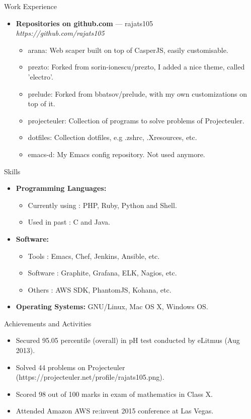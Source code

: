 \documentclass[a4paper,11pt,oneside]{article}
\newenvironment{ressection}[1]{
  \vspace{4pt}
         {\fontfamily{phv}\selectfont\Large#1}
         \begin{itemize}
           \vspace{3pt}
}{
         \end{itemize}
}
\newcommand{\resitem}[1]{
  \vspace{-4pt}
\item \begin{flushleft} #1 \end{flushleft}
}
\newcommand{\ressubitem}[1]{
  \vspace{-1pt}
\item \begin{flushleft} #1 \end{flushleft}
}
\newcommand{\resbigitem}[3]{
  \vspace{-5pt}
\item
  \textbf{#1} --- #2 \\
  \textit{#3}
}
\newenvironment{ressubsec}[3]{
  \resbigitem{#1}{#2}{#3}
  \vspace{-2pt}
  \begin{itemize}
}{
  \end{itemize}
}
\newenvironment{reslist}[1]{
  \resitem{\textbf{#1}}
  \vspace{-5pt}
  \begin{itemize}
}{
  \end{itemize}
}
\begin{document}
\begin{ressection}{Work Experience}
  \begin{ressubsec}{Repositories on github.com}{rajats105}{https://github.com/rajats105}
    \ressubitem{arana: Web scaper built on top of CasperJS, easily customisable.}
    \ressubitem{prezto: Forked from sorin-ionescu/prezto, I added a nice theme, called 'electro'.}
    \ressubitem{prelude: Forked from bbatsov/prelude, with my own customizations on top of it.}
    \ressubitem{projecteuler: Collection of programs to solve problems of Projecteuler.}
    \ressubitem{dotfiles: Collection dotfiles, e.g .zshrc, .Xresources, etc.}
    \ressubitem{emacs-d: My Emacs config repository. Not used anymore.}
  \end{ressubsec}
\end{ressection}


\begin{ressection}{Skills}
  \begin{reslist}{Programming Languages:}
    \ressubitem{Currently using : PHP, Ruby, Python and Shell.}
    \ressubitem{Used in past : C and Java.}
  \end{reslist}
  \begin{reslist}{Software:}
    \ressubitem{Tools : Emacs, Chef, Jenkins, Ansible, etc.}
    \ressubitem{Software : Graphite, Grafana, ELK, Nagios, etc.}
    \ressubitem{Others : AWS SDK, PhantomJS, Kohana, etc.}
  \end{reslist}
    \resitem{\textbf{Operating Systems:} GNU/Linux, Mac OS X, Windows OS.}
\end{ressection}


\begin{ressection}{Achievements and Activities}
  \resitem{Secured 95.05 percentile (overall) in pH test conducted by eLitmus (Aug 2013).}
  \resitem{Solved 44 problems on Projecteuler (https://projecteuler.net/profile/rajats105.png).}
  \resitem{Scored 98 out of 100 marks in exam of mathematics in Class X.}
  \resitem{Attended Amazon AWS re:invent 2015 conference at Las Vegas.}
\end{ressection}


\end{document}
